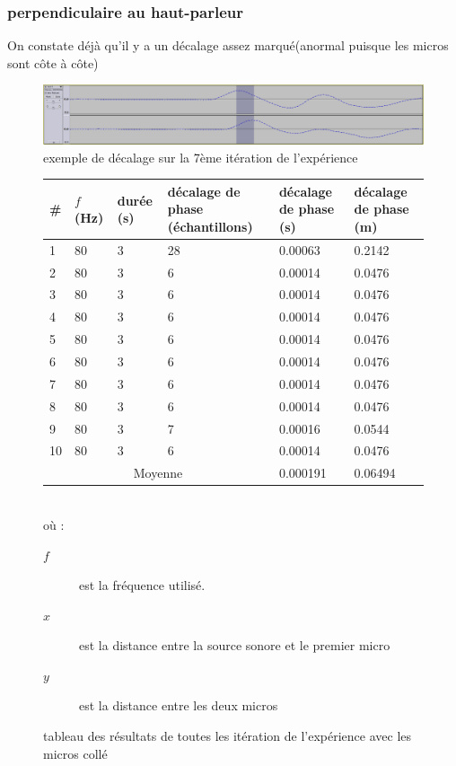 \subsubsection{perpendiculaire au haut-parleur}

On constate déjà qu'il y a un décalage assez marqué(anormal puisque les micros sont côte à côte)
\begin{figure}[h]
\includegraphics[width=\textwidth]{../tests/test_du_protocole/mesures_perpendiculaires/test7.png} 
\caption{exemple de décalage sur la 7ème itération de l'expérience}
\end{figure}

\begin{figure}[H]
\begin{center}
\begin{tabular}{|l || p{1.4cm} | p{1.4cm} | p{1.4cm} | p{1.7cm} | p{1.7cm}  |}
\hline
\# & $f$ (Hz) &  durée (s) & décalage de phase (échantillons) & décalage de phase (s) & décalage de phase (m)\\
\hline
\hline
1	&80	&3	&28 &0.00063	&0.2142\\
2	&80	&3	&6	&0.00014	&0.0476\\
3	&80	&3	&6	&0.00014	&0.0476\\
4	&80	&3	&6	&0.00014	&0.0476\\
5	&80	&3	&6	&0.00014	&0.0476\\
6	&80	&3	&6	&0.00014	&0.0476\\
7	&80	&3	&6	&0.00014	&0.0476\\
8	&80	&3	&6	&0.00014	&0.0476\\
9	&80	&3	&7	&0.00016	&0.0544\\
10	&80	&3	&6	&0.00014	&0.0476\\
\hline
\multicolumn{4}{|c|}{Moyenne} & 0.000191	&0.06494\\
\hline

\end{tabular}
\end{center}
~\\
où : 
\begin{description}
\item[$f$] est la fréquence utilisé.
\item[$x$] est la distance entre la source sonore et le premier micro
\item[$y$] est la distance entre les deux micros
\end{description}
\caption{tableau des résultats de toutes les itération de l'expérience avec les micros collé}
\end{figure}


